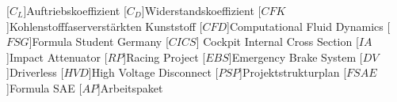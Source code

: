 [$C_L$]{Auftriebskoeffizient}
[$C_D$]{Widerstandskoeffizient}
[$CFK$]{Kohlenstofffaserverstärkten Kunststoff}
[$CFD$]{Computational Fluid Dynamics}
[$FSG$]{Formula Student Germany}
[$CICS$]{ Cockpit Internal Cross Section}
[$IA$]{Impact Attenuator}
[$RP$]{Racing Project}
[$EBS$]{Emergency Brake System}
[$DV$]{Driverless}
[$HVD$]{High Voltage Disconnect}
[$PSP$]{Projektstrukturplan}
[$FSAE$]{Formula SAE}
[$AP$]{Arbeitspaket}